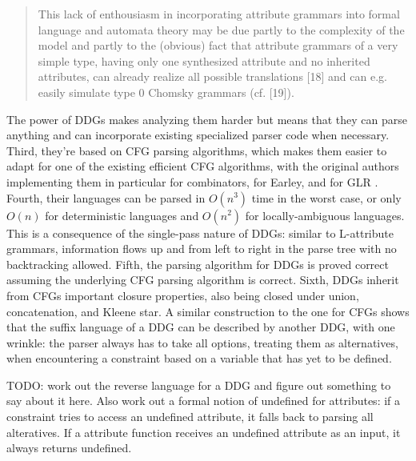 \documentclass[12pt]{article}
\begin{document}
\begin{quote}
  This lack of enthousiasm in incorporating attribute grammars into
  formal language and automata theory may be due partly to the
  complexity of the model and partly to the (obvious) fact that
  attribute grammars of a very simple type, having only one
  synthesized attribute and no inherited attributes, can already
  realize all possible translations [18] and can e.g. easily simulate
  type 0 Chomsky grammars (cf. [19]). \parencite{1V_AGs}
\end{quote}

The power of DDGs makes analyzing them harder but means that they can
parse anything and can incorporate existing specialized parser code
when necessary.  Third, they're based on CFG parsing algorithms, which
makes them easier to adapt for one of the existing efficient CFG
algorithms, with the original authors implementing them in particular
for combinators, for Earley, and for GLR \parencite{yakker2}.  Fourth,
their languages can be parsed in $O(n^3)$ time in the worst case, or
only $O(n)$ for deterministic languages and $O(n^2)$ for
locally-ambiguous languages.  This is a consequence of the single-pass
nature of DDGs: similar to L-attribute grammars, information flows up
and from left to right in the parse tree with no backtracking allowed.
Fifth, the parsing algorithm for DDGs is proved correct assuming the
underlying CFG parsing algorithm is correct.  Sixth, DDGs inherit from
CFGs important closure properties, also being closed under union,
concatenation, and Kleene star. A similar construction to the one for
CFGs shows that the suffix language of a DDG can be described by
another DDG, with one wrinkle: the parser always has to take all
options, treating them as alternatives, when encountering a constraint
based on a variable that has yet to be defined.

TODO: work out the reverse language for a DDG and figure out
something to say about it here.  Also work out a formal notion of
undefined for attributes: if a constraint tries to access an
undefined attribute, it falls back to parsing all alteratives.  If a
attribute function receives an undefined attribute as an input, it
always returns undefined.
\end{document}
